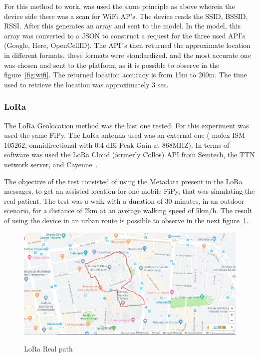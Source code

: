 For this method to work, was used the same principle as above wherein the device side there was a scan for WiFi AP's. The device reads the  SSID, BSSID, RSSI.
After this generates an array and sent to the model. In the model, this array was converted to a JSON to construct a request for the three used API's (Google, Here, OpenCellID).
The API´s then returned the approximate location in different formats, these formats were standardized, and the most accurate one was chosen and sent to the platform,  as it is possible to observe in the figure~\ref{fig:wifi}.
The returned location accuracy is from  15m to 200m. The time used to retrieve the location was approximately $3$ sec. 


\subsubsection{LoRa}
\label{subsubsec:LoRa}

The  LoRa Geolocation method was the last one tested. For this experiment was used the same FiPy. The LoRa antenna used was an external one ( molex ISM 105262, omnidirectional with 0.4 dBi Peak Gain at 868MHZ). In terms of software was used the LoRa Cloud (formerly Collos) API from Semtech, the TTN network server, and Cayenne~\cite{cayenne}.

The objective of the test consisted of using the Metadata present in the LoRa messages, to get an assisted location for one mobile FiPy, that was simulating the real patient. The test was a walk with a duration of 30 minutes, in an outdoor scenario, for a distance of 2km at an average walking speed of 5km/h. The result of using the device in an urban route is possible to observe in the next figure~\ref{fig:lora_geo_realpath}.

\begin{figure}[htbp]
  \centering
  
    {\includegraphics[width=0.8\linewidth]{Chapters/Figures/lorageorespercurso101019.PNG}}%
 
  \caption{LoRa Real path}
  \label{fig:lora_geo_realpath}
\end{figure}

